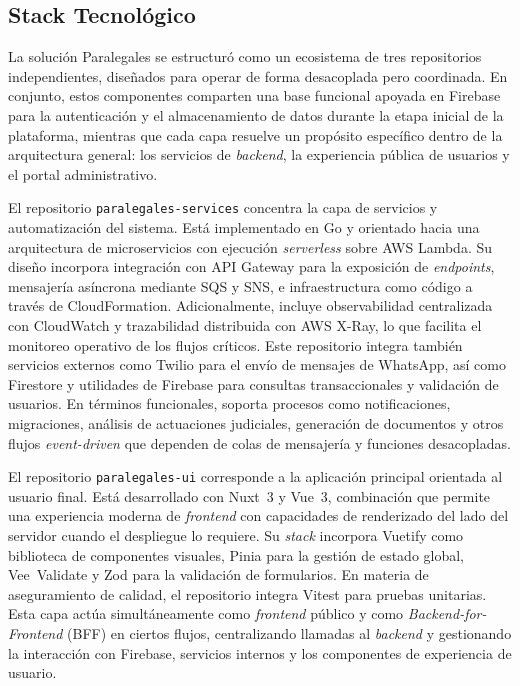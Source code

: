 \subsection{Stack Tecnológico}\label{subsec:stack}

La solución Paralegales se estructuró como un ecosistema de tres repositorios independientes, diseñados para operar de forma desacoplada pero coordinada. En conjunto, estos componentes comparten una base funcional apoyada en Firebase para la autenticación y el almacenamiento de datos durante la etapa inicial de la plataforma, mientras que cada capa resuelve un propósito específico dentro de la arquitectura general: los servicios de \textit{backend}, la experiencia pública de usuarios y el portal administrativo.

El repositorio \texttt{paralegales-services} concentra la capa de servicios y automatización del sistema. Está implementado en Go y orientado hacia una arquitectura de microservicios con ejecución \textit{serverless} sobre AWS Lambda. Su diseño incorpora integración con API Gateway para la exposición de \textit{endpoints}, mensajería asíncrona mediante SQS y SNS, e infraestructura como código a través de CloudFormation. Adicionalmente, incluye observabilidad centralizada con CloudWatch y trazabilidad distribuida con AWS X-Ray, lo que facilita el monitoreo operativo de los flujos críticos. Este repositorio integra también servicios externos como Twilio para el envío de mensajes de WhatsApp, así como Firestore y utilidades de Firebase para consultas transaccionales y validación de usuarios. En términos funcionales, soporta procesos como notificaciones, migraciones, análisis de actuaciones judiciales, generación de documentos y otros flujos \textit{event-driven} que dependen de colas de mensajería y funciones desacopladas.

El repositorio \texttt{paralegales-ui} corresponde a la aplicación principal orientada al usuario final. Está desarrollado con Nuxt~3 y Vue~3, combinación que permite una experiencia moderna de \textit{frontend} con capacidades de renderizado del lado del servidor cuando el despliegue lo requiere. Su \textit{stack} incorpora Vuetify como biblioteca de componentes visuales, Pinia para la gestión de estado global, Vee~Validate y Zod para la validación de formularios. En materia de aseguramiento de calidad, el repositorio integra Vitest para pruebas unitarias. Esta capa actúa simultáneamente como \textit{frontend} público y como \textit{Backend-for-Frontend} (BFF) en ciertos flujos, centralizando llamadas al \textit{backend} y gestionando la interacción con Firebase, servicios internos y los componentes de experiencia de usuario.


